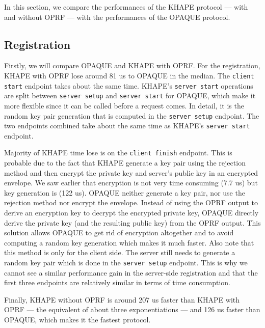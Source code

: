 ﻿\documentclass[../report.tex]{subfiles}
\begin{document}
In this section, we compare the performances of the KHAPE protocol --- with and without OPRF --- with the performances of the OPAQUE protocol.


\pgfplotsset{width=\textwidth-2.4cm}

\subsection*{Registration}
Firstly, we will compare OPAQUE and KHAPE with OPRF.
For the registration, KHAPE with OPRF lose around 81 us to OPAQUE in the median.
The \verb|client start| endpoint takes about the same time. KHAPE's \verb|server start| operations are split between \verb|server setup| and \verb|server start| for OPAQUE, which make it more flexible since it can be called before a request comes. In detail, it is the random key pair generation that is computed in the \verb|server setup| endpoint. The two endpoints combined take about the same time as KHAPE's \verb|server start| endpoint.

Majority of KHAPE time lose is on the \verb|client finish| endpoint.
This is probable due to the fact that KHAPE generate a key pair using the rejection method and then encrypt the private key and server's public key in an encrypted envelope.
We saw earlier that encryption is not very time consuming (7.7 us) but key generation is (122 us).
OPAQUE neither generate a key pair, nor use the rejection method nor encrypt the envelope.
Instead of using the OPRF output to derive an encryption key to decrypt the encrypted private key, OPAQUE directly derive the private key (and the resulting public key) from the OPRF output. This solution allows OPAQUE to get rid of encryption altogether and to avoid computing a random key generation which makes it much faster.
Also note that this method is only for the client side. The server still needs to generate a random key pair which is done in the \verb|server setup| endpoint. This is why we cannot see a similar performance gain in the server-side registration and that the first three endpoints are relatively similar in terms of time consumption.

Finally, KHAPE without OPRF is around 207 us faster than KHAPE with OPRF --- the equivalent of about three exponentiations --- and 126 us faster than OPAQUE, which makes it the fastest protocol.
\end{document}
